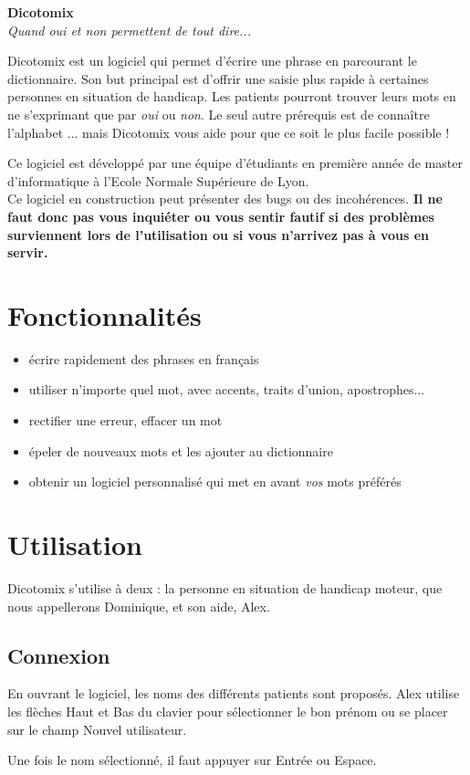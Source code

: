 \documentclass[french]{article}
\newcommand\image[2][.4]{\begin{center}\frame{\texttt{[image: images/\#2]}}\end{center}}
\begin{document}
	

\begin{center}
	\Huge\textbf{Dicotomix}\\
	\Large\textit{Quand oui et non permettent de tout dire...}
\end{center}
\vspace{1cm}

	Dicotomix est un logiciel qui permet d'écrire une phrase en parcourant le dictionnaire. Son but principal est d'offrir une saisie plus rapide à certaines personnes en situation de handicap. Les patients pourront trouver leurs mots en ne s'exprimant que par \emph{oui} ou \emph{non}. Le seul autre prérequis est de connaître l'alphabet ... mais Dicotomix vous aide pour que ce soit le plus facile possible !


	Ce logiciel est développé par une équipe d'étudiants en première année de master d'informatique à l'Ecole Normale Supérieure de Lyon.
\\

Ce logiciel en construction peut présenter des bugs ou des incohérences. \textbf{Il ne faut donc pas vous inquiéter ou vous sentir fautif si des problèmes surviennent lors de l'utilisation ou si vous n'arrivez pas à vous en servir.}

\section{Fonctionnalités}
\begin{itemize}
	\item écrire rapidement des phrases en français
	\item utiliser n'importe quel mot, avec accents, traits d'union, apostrophes...
	\item rectifier une erreur, effacer un mot
	\item épeler de nouveaux mots et les ajouter au dictionnaire
	\item obtenir un logiciel personnalisé qui met en avant \emph{vos} mots préférés
\end{itemize}

\section{Utilisation}
Dicotomix s'utilise à deux : la personne en situation de handicap moteur, que nous appellerons Dominique, et son aide, Alex.
\subsection{Connexion}
En ouvrant le logiciel, les noms des différents patients sont proposés. Alex utilise les flèches Haut et Bas du clavier pour sélectionner le bon prénom ou se placer sur le champ \og Nouvel utilisateur\fg{}.
\image{login.png}
Une fois le nom sélectionné, il faut appuyer sur Entrée ou Espace.
\end{document}
